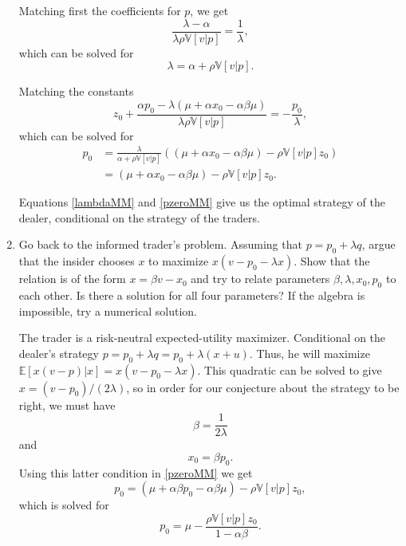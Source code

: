 \documentclass[11pt
]{exam}
\begin{document}
\begin{enumerate}[label=(\alph*). ]
\begin{solution}
 Matching first the coefficients for $p$, we get
\[
 \frac{\lambda-\alpha}{\lambda \rho \mathbb{V}[v|p]} =\frac{1}{\lambda},
\]
which can be solved for
\begin{equation} \label{lambdaMM}
\lambda =  \alpha + \rho \mathbb{V}[v|p].
\end{equation}

Matching the constants
\[
z_{0}+\frac{\alpha p_{0}-\lambda(\mu + \alpha x_{0} - \alpha \beta \mu) }{\lambda \rho \mathbb{V}[v|p]} = -\frac{p_{0}}{\lambda},
\]
which can be solved for 
\begin{align}
	p_{0} &=  \frac{\lambda}{\alpha+\rho \mathbb{V}[v|p]}((\mu + \alpha x_{0} - \alpha \beta \mu) - \rho \mathbb{V}[v|p] z_{0}) 
	\nonumber
	\\
	&=(\mu + \alpha x_{0} - \alpha \beta \mu) - \rho \mathbb{V}[v|p] z_{0}.
	\label{pzeroMM}
\end{align}

Equations \eqref{lambdaMM} and \eqref{pzeroMM} give us the optimal strategy of the dealer, conditional on the strategy of the traders.
\end{solution}

\item Go back to the informed trader's problem. Assuming that $p=p_{0}+ \lambda q$, argue that the insider chooses $x$ to maximize $x (v-p_{0} - \lambda x)$. Show that the relation is of the form $x =\beta v - x_{0}$ and try to relate parameters $\beta, \lambda, x_{0}, p_{0}$ to each other. Is there a solution for all four parameters? If the algebra is impossible, try a numerical solution.

\begin{solution}
The trader is a risk-neutral expected-utility maximizer. Conditional on the dealer's strategy $p=p_{0}+\lambda q=p_{0}+\lambda(x+u)$. Thus, he will maximize $\mathbb{E}[x(v-p)|x] = x(v-p_{0}-\lambda x)$. This quadratic can be solved to give $x=(v-p_{0})/(2\lambda)$, so in order for our conjecture about the strategy to be right, we must have
\begin{equation} \label{lambdatrader}
\beta=\frac{1}{2\lambda}
\end{equation}
and 
\begin{equation}
	x_{0}=\beta p_{0}.
	\label{eq:x0}
\end{equation} 
Using this latter condition in \eqref{pzeroMM} we get
\begin{equation}
	p_{0} = (\mu + \alpha \beta p_0 - \alpha \beta \mu) - \rho \mathbb{V}[v|p] z_{0},
\end{equation}
which is solved for
\begin{equation}
	p_{0} = \mu- \frac{\rho \mathbb{V}[v|p] z_0}{1-\alpha\beta}.
	\label{eq:p0}
\end{equation}
 

\end{solution}
\end{enumerate}
\end{document}
